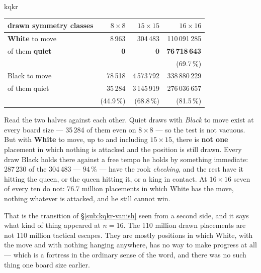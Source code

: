 \documentclass[11pt]{article}
\begin{document}
\begin{result}[title={Below the transition every draw White faces is tactical; above it most are not}]{kqkr}
\begin{center}\small
\begin{tabular}{@{}lrrr@{}}
\toprule
drawn symmetry classes & $8\times8$ & $15\times15$ & $16\times16$ \\
\midrule
\textbf{White} to move            & 8\,963 & 304\,483 & 110\,091\,285 \\
\quad of them \textbf{quiet}      & \textbf{0} & \textbf{0} & \textbf{76\,718\,643} \\
\quad                             &            &            & (69.7\,\%) \\
\addlinespace
Black to move                     & 78\,518 & 4\,573\,792 & 338\,880\,229 \\
\quad of them quiet               & 35\,284 & 3\,145\,919 & 276\,036\,657 \\
\quad                             & (44.9\,\%) & (68.8\,\%) & (81.5\,\%) \\
\bottomrule
\end{tabular}
\end{center}

\smallskip
Read the two halves against each other. Quiet draws with \emph{Black} to move
exist at every board size --- 35\,284 of them even on $8\times8$ --- so the test
is not vacuous. But with \textbf{White} to move, up to and including
$15\times15$, there is \textbf{not one} placement in which nothing is attacked
and the position is still drawn. Every draw Black holds there against a free
tempo he holds by something immediate: 287\,230 of the 304\,483 --- $94\,\%$ ---
have the rook \emph{checking}, and the rest have it hitting the queen, or the
queen hitting it, or a king in contact. At $16\times16$ seven of every ten do
not: 76.7 million placements in which White has the move, nothing whatever is
attacked, and he still cannot win.
\end{result}

\noindent
That is the transition of \S\ref{sub:kqkr-vanish} seen from a second side, and it says what kind
of thing appeared at $n=16$. The 110 million drawn placements are not 110
million tactical escapes. They are mostly positions in which White, with the
move and with nothing hanging anywhere, has no way to make progress at all ---
which is a fortress in the ordinary sense of the word, and there was no such
thing one board size earlier.
\end{document}
